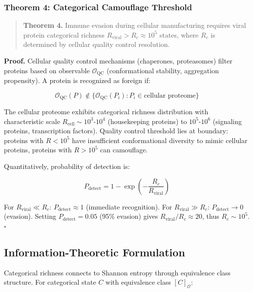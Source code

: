 \documentclass[11pt]{article}
\begin{document}
\subsubsection{Theorem 4: Categorical Camouflage Threshold}

\begin{quote}
\textbf{Theorem 4.} Immune evasion during cellular manufacturing requires viral protein categorical richness $R_{\text{viral}} > R_c \approx 10^5$ states, where $R_c$ is determined by cellular quality control resolution.
\end{quote}

\textbf{Proof.} Cellular quality control mechanisms (chaperones, proteasomes) filter proteins based on observable $\mathcal{O}_{\text{QC}}$ (conformational stability, aggregation propensity). A protein is recognized as foreign if:

\begin{equation}
\mathcal{O}_{\text{QC}}(P) \notin \{\mathcal{O}_{\text{QC}}(P_i) : P_i \in \text{cellular proteome}\}
\end{equation}

The cellular proteome exhibits categorical richness distribution with characteristic scale $R_{\text{cell}} \sim 10^3$-$10^4$ (housekeeping proteins) to $10^5$-$10^6$ (signaling proteins, transcription factors). Quality control threshold lies at boundary: proteins with $R < 10^5$ have insufficient conformational diversity to mimic cellular proteins, proteins with $R > 10^5$ can camouflage.

Quantitatively, probability of detection is:

\begin{equation}
P_{\text{detect}} = 1 - \exp\left(-\frac{R_c}{R_{\text{viral}}}\right)
\end{equation}

For $R_{\text{viral}} \ll R_c$: $P_{\text{detect}} \approx 1$ (immediate recognition). For $R_{\text{viral}} \gg R_c$: $P_{\text{detect}} \to 0$ (evasion). Setting $P_{\text{detect}} = 0.05$ (95\% evasion) gives $R_{\text{viral}}/R_c \approx 20$, thus $R_c \sim 10^5$. $\square$

\subsection{Information-Theoretic Formulation}

Categorical richness connects to Shannon entropy through equivalence class structure. For categorical state $C$ with equivalence class $[C]_{\mathcal{O}}$:
\end{document}
